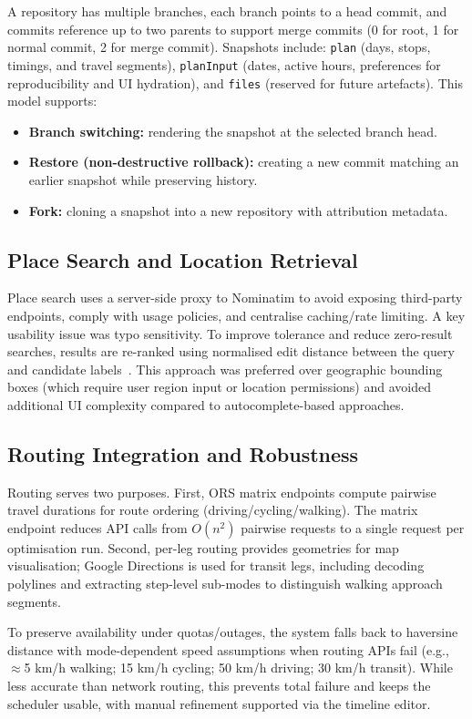A repository has multiple branches, each branch points to a head commit, and commits reference up to two parents to support merge commits (0 for root, 1 for normal commit, 2 for merge commit). Snapshots include: \texttt{plan} (days, stops, timings, and travel segments), \texttt{planInput} (dates, active hours, preferences for reproducibility and UI hydration), and \texttt{files} (reserved for future artefacts). This model supports:
\begin{itemize}
  \item \textbf{Branch switching:} rendering the snapshot at the selected branch head.
  \item \textbf{Restore (non-destructive rollback):} creating a new commit matching an earlier snapshot while preserving history.
  \item \textbf{Fork:} cloning a snapshot into a new repository with attribution metadata.
\end{itemize}

\subsection{Place Search and Location Retrieval}
Place search uses a server-side proxy to Nominatim to avoid exposing third-party endpoints, comply with usage policies, and centralise caching/rate limiting. A key usability issue was typo sensitivity. To improve tolerance and reduce zero-result searches, results are re-ranked using normalised edit distance between the query and candidate labels~\cite{navarro-guided}. This approach was preferred over geographic bounding boxes (which require user region input or location permissions) and avoided additional UI complexity compared to autocomplete-based approaches.

\subsection{Routing Integration and Robustness}
Routing serves two purposes. First, ORS matrix endpoints compute pairwise travel durations for route ordering (driving/cycling/walking). The matrix endpoint reduces API calls from $O(n^2)$ pairwise requests to a single request per optimisation run. Second, per-leg routing provides geometries for map visualisation; Google Directions is used for transit legs, including decoding polylines and extracting step-level sub-modes to distinguish walking approach segments.

To preserve availability under quotas/outages, the system falls back to haversine distance with mode-dependent speed assumptions when routing APIs fail (e.g., $\approx$5 km/h walking; 15 km/h cycling; 50 km/h driving; 30 km/h transit). While less accurate than network routing, this prevents total failure and keeps the scheduler usable, with manual refinement supported via the timeline editor.

